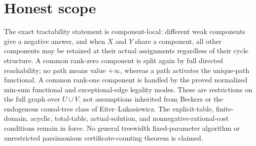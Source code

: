 \documentclass{article}
\begin{document}
\section{Honest scope}

The exact tractability statement is component-local: different weak components give a negative answer, and when \(X\) and \(Y\) share a component, all other components may be retained at their actual assignments regardless of their cycle structure. A common rank-zero component is split again by full directed reachability; no path means value \(+\infty\), whereas a path activates the unique-path functional. A common rank-one component is handled by the proved normalized min-sum functional and exceptional-edge legality modes. These are restrictions on the full graph over \(U\cup V\), not assumptions inherited from Beckers or the endogenous causal-tree class of Eiter--Lukasiewicz. The explicit-table, finite-domain, acyclic, total-table, actual-solution, and nonnegative-rational-cost conditions remain in force. No general treewidth fixed-parameter algorithm or unrestricted parsimonious certificate-counting theorem is claimed.
\end{document}
